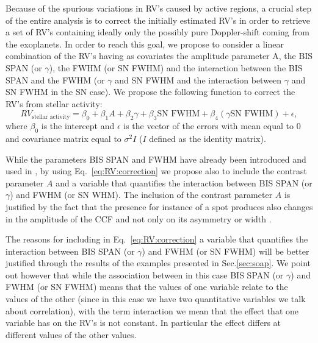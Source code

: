 \documentclass[11pt, oneside]{article}
\begin{document}
Because of the spurious variations in RV's caused by active regions, a crucial step of the entire analysis is to correct the initially estimated RV's in order to retrieve a set of RV's containing ideally only the possibly pure Doppler-shift coming from the exoplanets. In order to reach this goal, we propose to consider a linear combination of the RV's having as covariates the amplitude parameter A, the BIS SPAN (or $\gamma$), the FWHM (or SN FWHM) and the interaction between the BIS SPAN and the FWHM (or $\gamma$ and SN FWHM and the interaction between $\gamma$ and SN FWHM in the SN case). We propose the following function to correct the RV's from stellar activity:
%
\begin{equation}
RV_{\text{stellar activity}}= \beta_{0} + \beta_{1} A + \beta_{2} \gamma + \beta_{3} \text{SN FWHM} + \beta_{4} (\gamma  \text{SN FWHM})+\epsilon,
\label{eq:RV:correction}
\end{equation}
%
where $\beta_{0}$ is the intercept and $\epsilon$ is the vector of the errors with mean equal to $0$ and covariance matrix equal to $\sigma^{2}I$ ($I$ defined as the identity matrix). 

While the parameters BIS SPAN and FWHM have already been introduced and used in \citep{Dumusque:2017aa,Feng:2017aa}, by using Eq.~\ref{eq:RV:correction} we propose also to include the contrast parameter $A$ and a variable that quantifies the interaction between BIS SPAN (or $\gamma$) and FWHM (or SN WHM). The inclusion of the contrast parameter $A$ is justified by the fact that the presence for instance of a spot produces also changes in the amplitude of the CCF and not only on its asymmetry or width \citep[see e.g. Fig. 2 in ][]{Dumusque-2014b}.

The reasons for including in Eq.~\ref{eq:RV:correction} a variable that quantifies the interaction between BIS SPAN (or $\gamma$) and FWHM (or SN FWHM) will be better justified through the results of the examples presented in Sec.\ref{sec:soap}. We point out however that while the association between in this case BIS SPAN  (or $\gamma$) and FWHM (or SN FWHM) means that the values of one variable relate to the values of the other (since in this case we have two quantitative variables we talk about correlation), with the term interaction we mean that the effect that one variable has on the RV's is not constant. In particular the effect differs at different values of the other values. %
\end{document}
